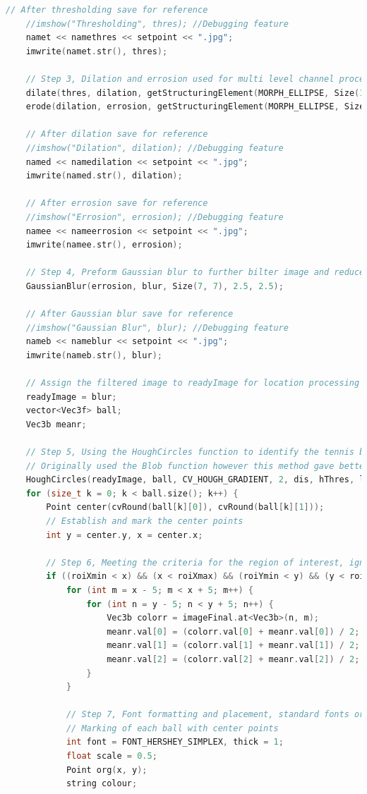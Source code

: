 \documentclass[a4paper, 10pt]{IEEEconf}
\begin{document}
\begin{lstlisting}[language = c++]
	// After thresholding save for reference
	//imshow("Thresholding", thres); //Debugging feature
	namet << namethres << setpoint << ".jpg";
	imwrite(namet.str(), thres);

	// Step 3, Dilation and errosion used for multi level channel processing 
	dilate(thres, dilation, getStructuringElement(MORPH_ELLIPSE, Size(11, 11)));
	erode(dilation, errosion, getStructuringElement(MORPH_ELLIPSE, Size(3, 3)));

	// After dilation save for reference
	//imshow("Dilation", dilation); //Debugging feature
	named << namedilation << setpoint << ".jpg";
	imwrite(named.str(), dilation);

	// After errosion save for reference
	//imshow("Errosion", errosion); //Debugging feature
	namee << nameerrosion << setpoint << ".jpg";
	imwrite(namee.str(), errosion);

	// Step 4, Preform Gaussian blur to further bilter image and reduce noise to better detect the raound point for the circles
	GaussianBlur(errosion, blur, Size(7, 7), 2.5, 2.5);

	// After Gaussian blur save for reference
	//imshow("Gaussian Blur", blur); //Debugging feature
	nameb << nameblur << setpoint << ".jpg";
	imwrite(nameb.str(), blur);

	// Assign the filtered image to readyImage for location processing
	readyImage = blur;
	vector<Vec3f> ball;
	Vec3b meanr;

	// Step 5, Using the HoughCircles function to identify the tennis ball radius
	// Originally used the Blob function however this method gave better results
	HoughCircles(readyImage, ball, CV_HOUGH_GRADIENT, 2, dis, hThres, lThres, minRad, maxRad);
	for (size_t k = 0; k < ball.size(); k++) {
		Point center(cvRound(ball[k][0]), cvRound(ball[k][1]));
		// Establish and mark the center points
		int y = center.y, x = center.x;

		// Step 6, Meeting the criteria for the region of interest, ignore rest
		if ((roiXmin < x) && (x < roiXmax) && (roiYmin < y) && (y < roiYmax)) {
			for (int m = x - 5; m < x + 5; m++) {
				for (int n = y - 5; n < y + 5; n++) {
					Vec3b colorr = imageFinal.at<Vec3b>(n, m);
					meanr.val[0] = (colorr.val[0] + meanr.val[0]) / 2;
					meanr.val[1] = (colorr.val[1] + meanr.val[1]) / 2;
					meanr.val[2] = (colorr.val[2] + meanr.val[2]) / 2;
				}
			}

			// Step 7, Font formatting and placement, standard fonts origionating from center point of each ball
			// Marking of each ball with center points
			int font = FONT_HERSHEY_SIMPLEX, thick = 1;
			float scale = 0.5;
			Point org(x, y);
			string colour;


\end{lstlisting}
\end{document}
